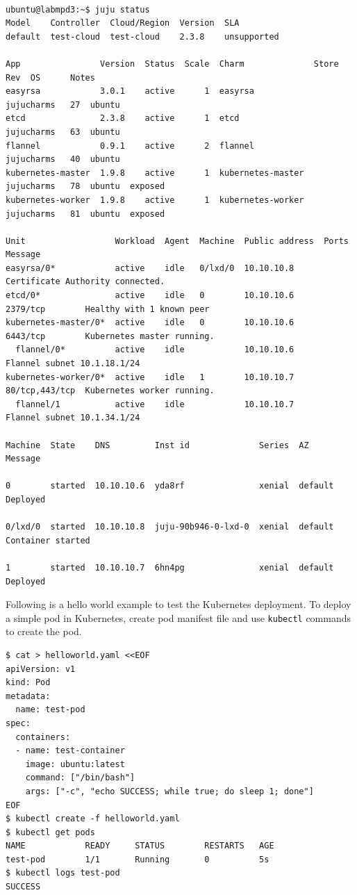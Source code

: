 \documentclass[english, 12pt, a4paper, elec, utf8, a-1b, online]{aaltothesis}
\begin{document}
\begin{lstlisting}[basicstyle={\tiny\ttfamily}]

ubuntu@labmpd3:~$ juju status
Model    Controller  Cloud/Region  Version  SLA
default  test-cloud  test-cloud    2.3.8    unsupported 

App                Version  Status  Scale  Charm              Store       Rev  OS      Notes
easyrsa            3.0.1    active      1  easyrsa            jujucharms   27  ubuntu  
etcd               2.3.8    active      1  etcd               jujucharms   63  ubuntu  
flannel            0.9.1    active      2  flannel            jujucharms   40  ubuntu  
kubernetes-master  1.9.8    active      1  kubernetes-master  jujucharms   78  ubuntu  exposed
kubernetes-worker  1.9.8    active      1  kubernetes-worker  jujucharms   81  ubuntu  exposed 

Unit                  Workload  Agent  Machine  Public address  Ports           Message
easyrsa/0*            active    idle   0/lxd/0  10.10.10.8                      Certificate Authority connected.
etcd/0*               active    idle   0        10.10.10.6      2379/tcp        Healthy with 1 known peer
kubernetes-master/0*  active    idle   0        10.10.10.6      6443/tcp        Kubernetes master running.
  flannel/0*          active    idle            10.10.10.6                      Flannel subnet 10.1.18.1/24
kubernetes-worker/0*  active    idle   1        10.10.10.7      80/tcp,443/tcp  Kubernetes worker running.
  flannel/1           active    idle            10.10.10.7                      Flannel subnet 10.1.34.1/24

Machine  State    DNS         Inst id              Series  AZ       Message

0        started  10.10.10.6  yda8rf               xenial  default  Deployed

0/lxd/0  started  10.10.10.8  juju-90b946-0-lxd-0  xenial  default  Container started

1        started  10.10.10.7  6hn4pg               xenial  default  Deployed
\end{lstlisting}

Following is a hello world example to test the Kubernetes deployment. To deploy a simple pod in Kubernetes, create pod manifest file and use \lstinline{kubectl} commands to create the pod.

\begin{lstlisting}[basicstyle={\small\ttfamily}]
$ cat > helloworld.yaml <<EOF
apiVersion: v1
kind: Pod
metadata:
  name: test-pod
spec:
  containers:
  - name: test-container
    image: ubuntu:latest
    command: ["/bin/bash"]
    args: ["-c", "echo SUCCESS; while true; do sleep 1; done"]
EOF
$ kubectl create -f helloworld.yaml
$ kubectl get pods
NAME            READY     STATUS        RESTARTS   AGE
test-pod        1/1       Running       0          5s
$ kubectl logs test-pod
SUCCESS
\end{lstlisting}
\end{document}
